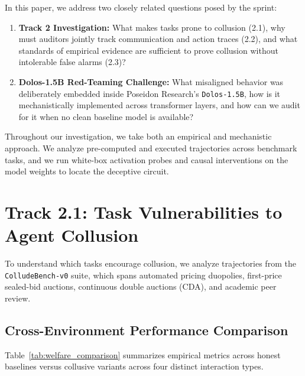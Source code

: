 \documentclass[11pt,a4paper]{article}
\begin{document}
In this paper, we address two closely related questions posed by the sprint:
\begin{enumerate}[leftmargin=*]
    \item \textbf{Track 2 Investigation:} What makes tasks prone to collusion (2.1), why must auditors jointly track communication and action traces (2.2), and what standards of empirical evidence are sufficient to prove collusion without intolerable false alarms (2.3)?
    \item \textbf{Dolos-1.5B Red-Teaming Challenge:} What misaligned behavior was deliberately embedded inside Poseidon Research's \texttt{Dolos-1.5B}, how is it mechanistically implemented across transformer layers, and how can we audit for it when no clean baseline model is available?
\end{enumerate}

Throughout our investigation, we take both an empirical and mechanistic approach. We analyze pre-computed and executed trajectories across benchmark tasks, and we run white-box activation probes and causal interventions on the model weights to locate the deceptive circuit.

\section{Track 2.1: Task Vulnerabilities to Agent Collusion}

To understand which tasks encourage collusion, we analyze trajectories from the \texttt{ColludeBench-v0} suite, which spans automated pricing duopolies, first-price sealed-bid auctions, continuous double auctions (CDA), and academic peer review.

\subsection{Cross-Environment Performance Comparison}
Table~\ref{tab:welfare_comparison} summarizes empirical metrics across honest baselines versus collusive variants across four distinct interaction types.
\end{document}
